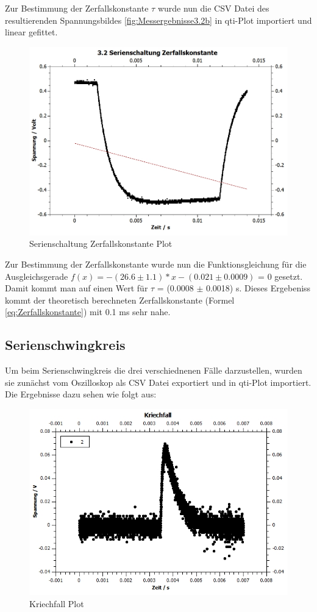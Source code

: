 \documentclass[12pt,a4paper,twoside]{article}
\begin{document}
\noindent
Zur Bestimmung der Zerfallskonstante $\tau$ wurde nun die CSV Datei des resultierenden Spannungsbildes \ref*{fig:Messergebnisse3.2b} in qti-Plot importiert und linear gefittet.

\begin{figure}[H]
    \centering
    \includegraphics[width=0.6\linewidth, angle=0]{nudes/Zerfallskonstante Plot.jpg}
    \caption{Serienschaltung Zerfallskonstante Plot}
    \label{fig:SerienschaltungTauPlot}
\end{figure}

\noindent
Zur Bestimmung der Zerfallskonstante wurde nun die Funktionsgleichung für die Ausgleichsgerade $f(x) = -(26.6 \pm 1.1) *x-(0.021 \pm 0.0009)$ = 0 gesetzt. Damit kommt man auf einen Wert für $\tau$ = (0.0008 $\pm$ 0.0018) s.
Dieses Ergebeniss kommt der theoretisch berechneten Zerfallskonstante (Formel \ref{eq:Zerfallskonstante}) mit 0.1 ms sehr nahe.


\subsection{Serienschwingkreis}

Um beim Serienschwingkreis die drei verschiednenen Fälle darzustellen, wurden sie zunächst vom Oszilloskop als CSV Datei exportiert und in qti-Plot importiert. Die Ergebnisse dazu sehen wie folgt aus:

\begin{figure}[H]
    \centering
    \includegraphics[width=0.6\linewidth, angle=0]{nudes/KriechfallPlot.jpg}
    \caption{Kriechfall Plot}
    \label{fig:KriechfallPlot}
\end{figure}
\end{document}
